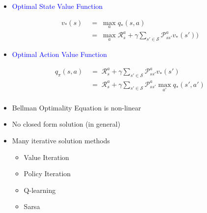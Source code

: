 \documentclass[landscape]{article}
\def\tcb{\textcolor{blue}}
\begin{document}
\begin{itemize}
    \huge
    \item \tcb{Optimal State Value Function}\\
    \LARGE
    \begin{multiline}\notag
        \begin{align}
             v_* (s)&\;=\; \max\limits_{a} q_* (s,a)\\
             & \;=\; \max\limits_{a}\mathcal{R}_s^a +{\gamma}\sum\limits_{s' \in \mathcal{S}} \mathcal{P}_{ss'}^a v_* (s'))
         \end{align}
    \end{multiline}

    \huge
    \item \tcb{Optimal Action Value Function}\\
    \LARGE
    \begin{multiline}\notag
        \begin{align}
            q_\pi (s,a)&\;=\;\mathcal{R}_s^a +{\gamma}\sum\limits_{s' \in \mathcal{S}} \mathcal{P}_{ss'}^a v_* (s')\\
            & \;=\;\mathcal{R}_s^a +{\gamma}\sum\limits_{s' \in \mathcal{S}} \mathcal{P}_{ss'}^a \max\limits_{a'} q_* (s',a')\\
        \end{align}
     \end{multiline}
\end{itemize}

\vspace{0.5cm}

\newpage
\newvgtitle{\tcb{Solving the Bellman Optimality Equation}}
\LARGE
\vspace{-.5em}
\vspace{0.5cm}
\begin{itemize}
    \item Bellman Optimality Equation is non-linear
\vspace{1.5cm}
    \item No closed form solution (in general)
\vspace{1.5cm}
    \item Many iterative solution methods
    \begin{itemize}
        \item Value Iteration
\vspace{0.5cm}
        \item Policy Iteration
\vspace{0.5cm}
        \item Q-learning
\vspace{0.5cm}
        \item Sarsa
    \end{itemize}
\end{itemize}

\vspace{0.5cm}
\end{document}
